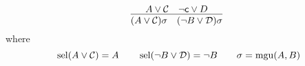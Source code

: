 

\[
	\infer
	[]
	{(A \lor \mcC)\sigma\quad(\lnot B\lor \mcD)\sigma}
	{A \lor \mcC& \lnot \mc\lor D}
	\]
	where
	\[
		\operatorname{sel}(A\lor{\mathcal C}) = A\qquad\operatorname{sel}(\lnot B\lor {\mathcal D}) = \lnot{B}\qquad\sigma=\operatorname{mgu}(A,B)
	\]